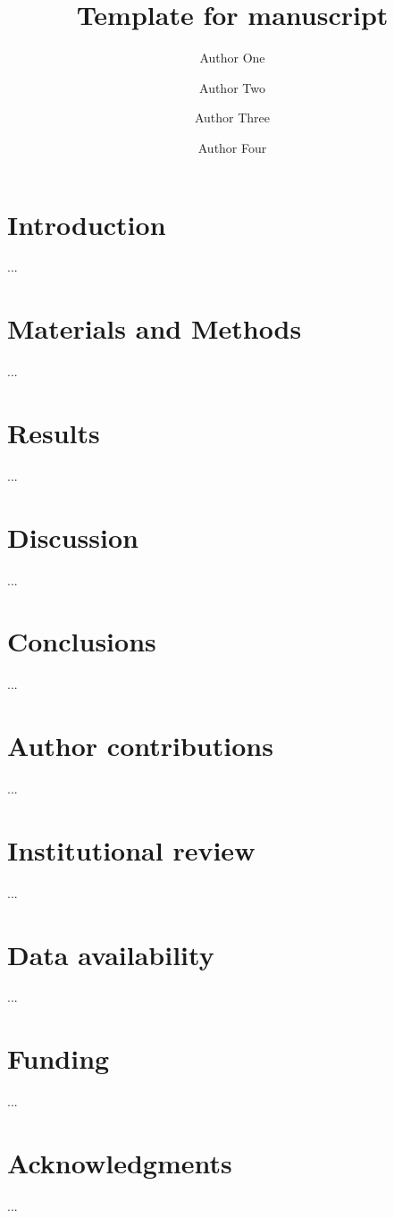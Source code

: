 \documentclass[11pt,lineno]{manuscript}\usepackage[]{graphicx}\usepackage[]{xcolor}
\title{Template for manuscript}
\author[1]{Author One}
\author[1]{Author Two}
\author[2,3]{Author Three}
\author[1]{Author Four}
\affil[1]{Author one affiliation}
\affil[2]{Author two affiliation}
\affil[3]{Author three affiliation}
\begin{document}
\flushbottom
\maketitle
\thispagestyle{empty}

\section*{Introduction}
...

\section*{Materials and Methods}
...

\section*{Results}
...
 
\section*{Discussion}
...

\section*{Conclusions}
...

\section*{Author contributions}
...

\section*{Institutional review}
...

\section*{Data availability} 
...

\section*{Funding}
...

\section*{Acknowledgments}
...
\end{document}
